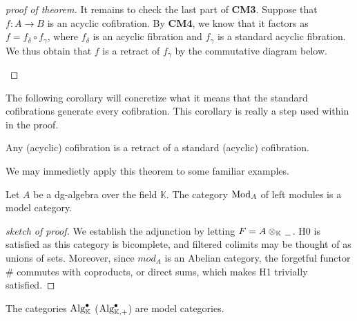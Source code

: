 \documentclass[../thesis.tex]{subfiles}
\begin{document}
\begin{proof}[proof of theorem]
                It remains to check the last part of \textbf{CM3}. Suppose that $f:A\rightarrow B$ is an acyclic cofibration. By \textbf{CM4}, we know that it factors as $f = f_\delta \circ f_\gamma$, where $f_\delta$ is an acyclic fibration and $f_\gamma$ is a standard acyclic fibration. We thus obtain that $f$ is a retract of $f_\gamma$ by the commutative diagram below.
                \begin{center}
                \end{center}
            \end{proof}

            The following corollary will concretize what it means that the standard cofibrations generate every cofibration. This corollary is really a step used within in the proof.

            \begin{corollary}
                Any (acyclic) cofibration is a retract of a standard (acyclic) cofibration.
            \end{corollary}

            We may immedietly apply this theorem to some familiar examples.

            \begin{corollary}\label{cor: Model-Mod}
                Let $A$ be a dg-algebra over the field $\mathbb{K}$. The category $\tt{Mod}_A$ of left modules is a model category.
            \end{corollary}

            \begin{proof}[sketch of proof]
                We establish the adjunction by letting $F = A\otimes_\mathbb{K}\argument$. H0 is satisfied as this category is bicomplete, and filtered colimits may be thought of as unions of sets. Moreover, since $mod_A$ is an Abelian category, the forgetful functor $\#$ commutes with coproducts, or direct sums, which makes H1 trivially satisfied.
            \end{proof}

            \begin{corollary}
                The categories $\tt{Alg}^\bullet_\mathbb{K}$ ($\tt{Alg}^\bullet_{\mathbb{K},+}$) are model categories.
            \end{corollary}
\end{document}
